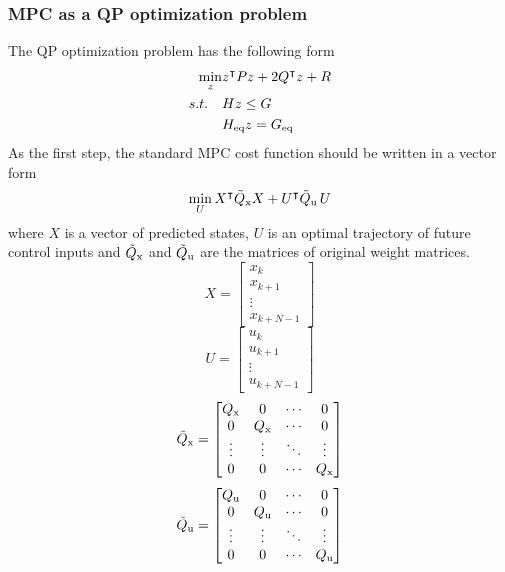 \subsubsection{MPC as a QP optimization problem}
The QP optimization problem has the following form
\begin{subequations}
	\begin{align}
	\min_{z} & z^\intercal Pz + 2Q^\intercal z + R\\
	\label{cst_qp}s.t.\quad&Hz\leq G\\
	&H _{\text{eq}}z = G _{\text{eq}}
	\end{align}
\end{subequations}
As the first step, the standard MPC cost function should be written in a vector form
\begin{equation}
	\min_{U} X^\intercal\tilde{Q} _{\text{x}}X + U^\intercal\tilde{Q} _{\text{u}}\,U\\
\end{equation}
where $X$ is a vector of predicted states, $U$ is an optimal trajectory of future control inputs and $\tilde{Q} _{\text{x}}$ and $\tilde{Q} _{\text{u}}$ are the matrices of original weight matrices.
\begin{equation}
	X = \begin{bmatrix}
	x_k\\x_{k+1}\\\vdots\\x_{k+N-1}
		\end{bmatrix}
\end{equation}
\begin{equation}
U = \begin{bmatrix}
u_k\\u_{k+1}\\\vdots\\u_{k+N-1}
\end{bmatrix}
\end{equation}
\begin{equation}
\tilde{Q} _{\text{x}} = \begin{bmatrix}
Q _{\text{x}}&0&\cdots&0\\
0&Q _{\text{x}}&\cdots&0\\
\vdots&\vdots&\ddots&\vdots\\
0&0&\cdots&Q _{\text{x}}
\end{bmatrix}
\end{equation}
\begin{equation}
\tilde{Q} _{\text{u}} = \begin{bmatrix}
Q _{\text{u}}&0&\cdots&0\\
0&Q _{\text{u}}&\cdots&0\\
\vdots&\vdots&\ddots&\vdots\\
0&0&\cdots&Q _{\text{u}}
\end{bmatrix}
\end{equation}
